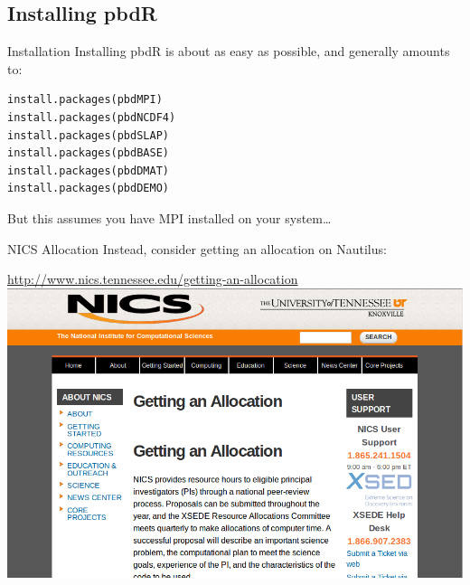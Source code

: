 \subsection{Installing pbdR}

\begin{frame}[fragile]
  \begin{block}{Installation}\pause
  Installing pbdR is about as easy as possible, and generally amounts to:
  \begin{lstlisting}
install.packages(pbdMPI)
install.packages(pbdNCDF4)
install.packages(pbdSLAP)
install.packages(pbdBASE)
install.packages(pbdDMAT)
install.packages(pbdDEMO)
  \end{lstlisting}
  But this assumes you have MPI installed on your system\dots
  \end{block}
\end{frame}


\begin{frame}[fragile]
  \begin{block}{NICS Allocation}\pause
  Instead, consider getting an allocation on Nautilus:
  \begin{center}
  \url{http://www.nics.tennessee.edu/getting-an-allocation}\\
  \includegraphics[scale=.3]{pics/nics}
  \end{center}
  \end{block}
\end{frame}